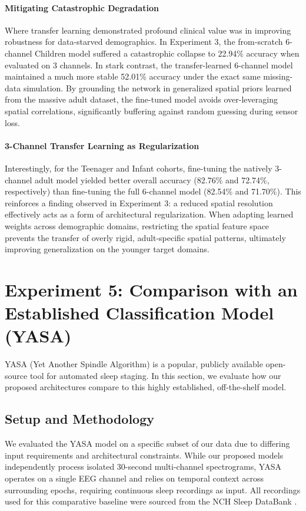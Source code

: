 \paragraph{Mitigating Catastrophic Degradation}
Where transfer learning demonstrated profound clinical value was in improving robustness for data-starved demographics. In Experiment 3, the from-scratch 6-channel Children model suffered a catastrophic collapse to 22.94\% accuracy when evaluated on 3 channels. In stark contrast, the transfer-learned 6-channel model maintained a much more stable 52.01\% accuracy under the exact same missing-data simulation. By grounding the network in generalized spatial priors learned from the massive adult dataset, the fine-tuned model avoids over-leveraging spatial correlations, significantly buffering against random guessing during sensor loss.

\paragraph{3-Channel Transfer Learning as Regularization}
Interestingly, for the Teenager and Infant cohorts, fine-tuning the natively 3-channel adult model yielded better overall accuracy (82.76\% and 72.74\%, respectively) than fine-tuning the full 6-channel model (82.54\% and 71.70\%). This reinforces a finding observed in Experiment 3: a reduced spatial resolution effectively acts as a form of architectural regularization. When adapting learned weights across demographic domains, restricting the spatial feature space prevents the transfer of overly rigid, adult-specific spatial patterns, ultimately improving generalization on the younger target domains.

\FloatBarrier
\section{Experiment 5: Comparison with an Established Classification Model (YASA)}
YASA (Yet Another Spindle Algorithm) \cite{VallatWalker2021} is a popular, publicly available open-source tool for automated sleep staging. In this section, we evaluate how our proposed architectures compare to this highly established, off-the-shelf model. 

\subsection{Setup and Methodology}
We evaluated the YASA model on a specific subset of our data due to differing input requirements and architectural constraints. While our proposed models independently process isolated 30-second multi-channel spectrograms, YASA operates on a single EEG channel and relies on temporal context across surrounding epochs, requiring continuous sleep recordings as input. All recordings used for this comparative baseline were sourced from the NCH Sleep DataBank \cite{NCHSleep}.


